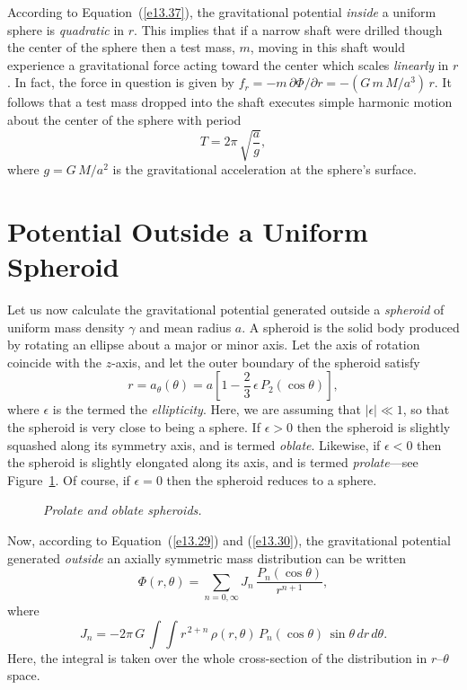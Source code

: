 According to Equation~(\ref{e13.37}), the gravitational potential {\em inside}\/ a uniform
sphere is {\em quadratic}\/ in $r$. This implies that if a narrow shaft were
drilled though the center of the sphere then a test mass, $m$, moving in this
shaft would experience a gravitational force acting toward the
center which scales {\em linearly}\/ in $r$. In fact, the
force in question is given by $f_r = -m\,\partial\Phi/\partial r = -(G\,m\,M/a^3)\,r$. It follows that a test mass dropped into the shaft executes simple
harmonic motion about the center of the sphere with period
\begin{equation}
T = 2\pi\,\sqrt{\frac{a}{g}},
\end{equation}
where $g=G\,M/a^2$ is the gravitational acceleration at the sphere's surface.

\section{Potential Outside a Uniform Spheroid}
Let us now calculate the gravitational potential generated outside a {\em spheroid}\/
of uniform mass density $\gamma$ and mean radius $a$. A spheroid is
the solid body produced by rotating an ellipse about a major or
minor axis. Let the axis of rotation coincide with the $z$-axis,
and let the  outer boundary of the spheroid satisfy
\begin{equation}\label{e13.41}
r = a_\theta(\theta) = a\left[1-\frac{2}{3}\,\epsilon\,P_2(\cos\theta)\right],
\end{equation}
where  $\epsilon$ is the termed the {\em ellipticity}. Here, we
are assuming that $|\epsilon|\ll 1$, so that the spheroid is very close to being a
sphere. If $\epsilon>0$ then the spheroid is
slightly squashed along its symmetry axis, and is termed {\em oblate}. Likewise, if $\epsilon<0$ then the spheroid is slightly elongated along its axis, and is
termed {\em prolate}---see Figure~\ref{fsph}.
Of course, if $\epsilon=0$ then the spheroid reduces to a sphere.

\begin{figure}
\epsfysize=2.25in
\centerline{}
\caption{\em Prolate and oblate spheroids.}\label{fsph}
\end{figure}

Now, according to Equation~(\ref{e13.29}) and (\ref{e13.30}), the gravitational
potential generated {\em outside}\/ an axially symmetric mass distribution
can be written
\begin{equation}
\Phi(r,\theta) = \sum_{n=0,\infty} J_n\,\frac{P_n(\cos\theta)}{r^{n+1}},
\end{equation}
where
\begin{equation}\label{e13.43}
J_n = - 2\pi\,G\,\int\int r^{\,2+n}\,\rho(r,\theta)\,P_n(\cos\theta)\,\sin\theta\,dr\,d\theta.
\end{equation}
Here, the integral is taken over the whole cross-section of the distribution
in $r$--$\theta$ space.

